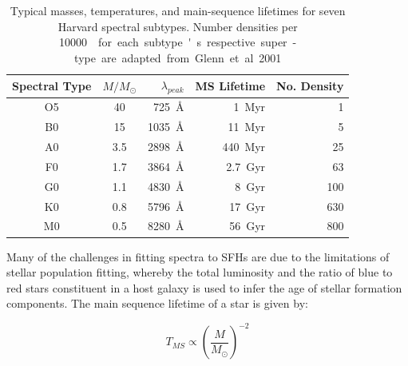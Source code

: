 \documentclass[a4paper,11pt]{article}
\begin{document}
\begin{table}
  \centering
  \begin{tabular}{c c r r r}
    Spectral Type & $M/M_\odot$ & $\lambda_{peak}$     & MS Lifetime   & No. Density \\
    \hline \hline
    O5            &	40          & \SI{725}{\angstrom}  & \SI{1}{Myr}   & 1           \\
    B0            &	15          & \SI{1035}{\angstrom} & \SI{11}{Myr}  & 5           \\
    A0            &	3.5         & \SI{2898}{\angstrom} & \SI{440}{Myr} & 25          \\
    F0            &	1.7         & \SI{3864}{\angstrom} & \SI{2.7}{Gyr} & 63          \\
    G0            &	1.1         & \SI{4830}{\angstrom} & \SI{8}{Gyr}   & 100         \\
    K0            &	0.8         & \SI{5796}{\angstrom} & \SI{17}{Gyr}  & 630         \\
    M0            &	0.5         & \SI{8280}{\angstrom} & \SI{56}{Gyr}  & 800         \\
    \hline
  \end{tabular}
  \caption{Typical masses, temperatures, and main-sequence lifetimes for seven Harvard spectral subtypes. Number densities per \SI{10000}{\cubic\parsec} for each subtype's respective super-type are adapted from Glenn et al. 2001.\cite{Glenn_2001}}
  \label{tab:star_lifetimes_densities}
\end{table}

Many of the challenges in fitting spectra to SFHs are due to the limitations of stellar population fitting, whereby the total luminosity and the ratio of blue to red stars constituent in a host galaxy is used to infer the age of stellar formation components. The main sequence lifetime of a star is given by\cite{Prialnik_2010}:

\begin{equation}
  T_{MS} \propto \left(\frac{M}{M_\odot}\right)^{-2}
\end{equation}
\end{document}
